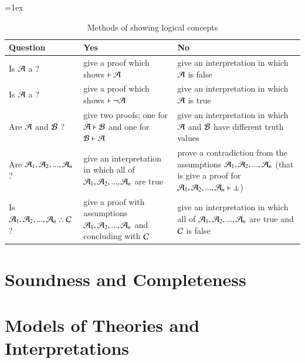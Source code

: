 \documentclass[12pt, a4paper, oneside, openright, titlepage]{book}
\begin{document}
\begin{table}[H]
\tabulinesep=1ex
\begin{tabu}{X[.5,c,m] ||X[1,l,m] |X[1,l,m]}
\textbf{Question} 		&	\textbf{Yes} 	&	\textbf{No} \\ \hline \hline

    Is $\mathcal{A}$ a ?  &	give a proof which shows $\vdash \mathcal{A}$ & give an interpretation in which $\mathcal{A}$ is false	 \\ \hline
 
Is $\mathcal{A}$ a ?  &	give a proof which shows $\vdash\neg \mathcal{A}$ & give an interpretation in which $\mathcal{A}$ is true	 \\ \hline

    Are $\mathcal{A}$ and $\mathcal{B}$ ? &	give two proofs; one for $\mathcal{A}\vdash \mathcal{B}$ and one for $\mathcal{B}\vdash\mathcal{A}$ & give an interpretation in which $\mathcal{A}$ and $\mathcal{B}$ have different truth values	 \\ \hline


    Are $\mathcal{A}_1,\mathcal{A}_2,...,\mathcal{A}_n$ ? &	give an interpretation in which all of $\mathcal{A}_1,\mathcal{A}_2,...,\mathcal{A}_n$ are true & prove a contradiction from the assumptions $\mathcal{A}_1,\mathcal{A}_2,...,\mathcal{A}_n$ (that is give a proof for $\mathcal{A}_1,\mathcal{A}_2,...,\mathcal{A}_n\vdash \bot$)	 \\ \hline
    Is $\metav{A}_1,\metav{A}_2,...,\metav{A}_n\therefore\metav{C}$ ? &	give a proof with assumptions $\mathcal{A}_1,\mathcal{A}_2,...,\mathcal{A}_n$ and concluding with $\mathcal{C}$ & give an interpretation in which all of $\mathcal{A}_1,\mathcal{A}_2,...,\mathcal{A}_n$ are true and $\mathcal{C}$ is false \\ \hline
\end{tabu}
\caption{Methods of showing logical concepts}
\label{table:proofs_or_interpretations}
\end{table}




\chapter{\textsection\textsection Soundness and Completeness}


\chapter{\textsection\textsection Models of Theories and Interpretations}
\end{document}
